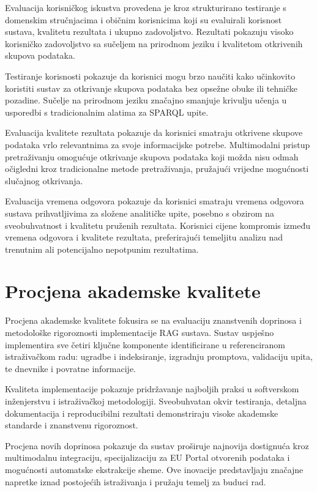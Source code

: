 Evaluacija korisničkog iskustva provedena je kroz strukturirano testiranje s domenskim stručnjacima i običnim korisnicima koji su evaluirali korisnost sustava, kvalitetu rezultata i ukupno zadovoljstvo. Rezultati pokazuju visoko korisničko zadovoljstvo sa sučeljem na prirodnom jeziku i kvalitetom otkrivenih skupova podataka.

Testiranje korisnosti pokazuje da korisnici mogu brzo naučiti kako učinkovito koristiti sustav za otkrivanje skupova podataka bez opsežne obuke ili tehničke pozadine. Sučelje na prirodnom jeziku značajno smanjuje krivulju učenja u usporedbi s tradicionalnim alatima za SPARQL upite.

Evaluacija kvalitete rezultata pokazuje da korisnici smatraju otkrivene skupove podataka vrlo relevantnima za svoje informacijske potrebe. Multimodalni pristup pretraživanju omogućuje otkrivanje skupova podataka koji možda nisu odmah očigledni kroz tradicionalne metode pretraživanja, pružajući vrijedne mogućnosti slučajnog otkrivanja.

Evaluacija vremena odgovora pokazuje da korisnici smatraju vremena odgovora sustava prihvatljivima za složene analitičke upite, posebno s obzirom na sveobuhvatnost i kvalitetu pruženih rezultata. Korisnici cijene kompromis između vremena odgovora i kvalitete rezultata, preferirajući temeljitu analizu nad trenutnim ali potencijalno nepotpunim rezultatima.

\section{Procjena akademske kvalitete}
\label{sec:academic_quality}

Procjena akademske kvalitete fokusira se na evaluaciju znanstvenih doprinosa i metodološke rigoroznosti implementacije RAG sustava. Sustav uspješno implementira sve četiri ključne komponente identificirane u referenciranom istraživačkom radu: ugradbe i indeksiranje, izgradnju promptova, validaciju upita, te dnevnike i povratne informacije.

Kvaliteta implementacije pokazuje pridržavanje najboljih praksi u softverskom inženjerstvu i istraživačkoj metodologiji. Sveobuhvatan okvir testiranja, detaljna dokumentacija i reproducibilni rezultati demonstriraju visoke akademske standarde i znanstvenu rigoroznost.

Procjena novih doprinosa pokazuje da sustav proširuje najnovija dostignuća kroz multimodalnu integraciju, specijalizaciju za EU Portal otvorenih podataka i mogućnosti automatske ekstrakcije sheme. Ove inovacije predstavljaju značajne napretke iznad postojećih istraživanja i pružaju temelj za buduci rad.

